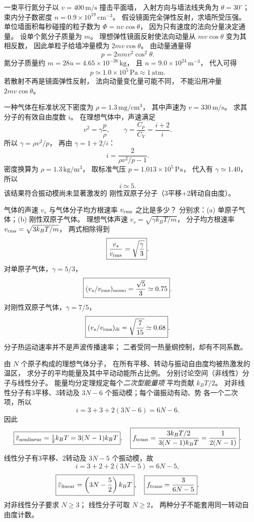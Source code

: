 一束平行氮分子以
$v=400\,\mathrm{m/s}$ 撞击平面墙，
入射方向与墙法线夹角为
$\theta=30^\circ$；
束内分子数密度
$n=0.9\times10^{19}\,\mathrm{cm^{-3}}$。
假设镜面完全弹性反射，求墙所受压强。
\exsolution
单位墙面积每秒碰撞的粒子数为
$\Phi=nv\cos\theta$，
因为只有速度的法向分量决定通量。
设单个氮分子质量为 $m$。
理想弹性镜面反射使法向动量从
$mv\cos\theta$ 变为其相反数，
因此单粒子给墙冲量模为
$2mv\cos\theta$。
由动量通量得
\[
\boxed{p=2nmv^2\cos^2\theta}.
\]
氮分子质量约
$m=28u=4.65\times10^{-26}\,\mathrm{kg}$，
且 $n=9.0\times10^{24}\,\mathrm{m^{-3}}$，
代入可得
\[
\boxed{p\simeq1.0\times10^5\,\mathrm{Pa}\approx1\,\mathrm{atm}}.
\]
\excheck 若散射不再是镜面弹性反射，
法向动量变化量可能不同，
不能沿用冲量 $2mv\cos\theta$。

一种气体在标准状况下密度为
$\rho=1.3\,\mathrm{mg/cm^3}$，
其中声速为 $v=330\,\mathrm{m/s}$。
求其分子的有效自由度数 $i$。
\exsolution
在理想气体中，声速满足
\[
v^2=\gamma\frac p\rho,\qquad
\gamma=\frac{C_p}{C_V}=\frac{i+2}{i}.
\]
所以
$\gamma=\rho v^2/p$，
再由 $\gamma=1+2/i$：
\[
\boxed{i=\frac2{\rho v^2/p-1}}.
\]
密度换算为
$\rho=1.3\,\mathrm{kg/m^3}$，
取标准气压
$p=1.013\times10^5\,\mathrm{Pa}$，
代入有
$\gamma\simeq1.40$，
所以
\[
\boxed{i\simeq5}.
\]
\excheck 该结果符合振动模尚未显著激发的
刚性双原子分子（3平移+2转动自由度）。

气体的声速 $v_s$ 与气体分子均方根速率
$v_{\rm rms}$ 之比是多少？
分别求：(a) 单原子气体；(b) 刚性双原子气体。
\exsolution
理想气体声速
$v_s=\sqrt{\gamma k_BT/m}$，
分子均方根速率
$v_{\rm rms}=\sqrt{3k_BT/m}$，
两式相除得到
\[
\boxed{\frac{v_s}{v_{\rm rms}}=\sqrt{\frac\gamma3}}.
\]
对单原子气体，$\gamma=5/3$，
\[
\boxed{(v_s/v_{\rm rms})_{\rm mono}
=\frac{\sqrt5}{3}\simeq0.75}.
\]
对刚性双原子气体，$\gamma=7/5$，
\[
\boxed{(v_s/v_{\rm rms})_{\rm di}
=\sqrt{\frac7{15}}\simeq0.68}.
\]
\excheck 分子热运动速率并不是声波传播速率；
二者受同一热量纲控制，却有不同系数。

由 $N$ 个原子构成的理想气体分子，
在所有平移、转动与振动自由度均被热激发的温区，
求分子的平均能量及其中平动动能所占比例。
分别讨论空间（非线性）分子与线性分子。
\exsolution
能量均分定理规定每个\emph{二次型能量项}
平均贡献 $k_BT/2$。
对非线性分子有3平移、3转动及
$3N-6$ 个振动模；每个谐振动有动、势
各一个二次项，所以
\[
i=3+3+2(3N-6)=6N-6.
\]
因此
\[
\boxed{\overline\varepsilon_{\rm nonlinear}
=\tfrac i2k_BT=3(N-1)k_BT},
\quad
\boxed{f_{\rm trans}=\frac{3k_BT/2}{3(N-1)k_BT}
=\frac1{2(N-1)}}.
\]
线性分子有3平移、2转动及
$3N-5$ 个振动模，故
\[
i=3+2+2(3N-5)=6N-5,
\]
\[
\boxed{\overline\varepsilon_{\rm linear}
=\left(3N-\frac52\right)k_BT},\quad
\boxed{f_{\rm trans}=\frac3{6N-5}}.
\]
\excheck 对非线性分子要求 $N\ge3$；
线性分子可取 $N\ge2$，
两种分子不能套用同一转动自由度计数。

